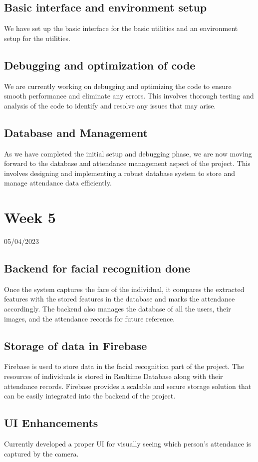 \documentclass[12pt]{book}
\begin{document}
	\section{Basic interface and environment setup}
	We have set up the basic interface for the basic utilities and an environment setup for the utilities.
	\section{Debugging and optimization of code}
	We are currently working on debugging and optimizing the code to ensure smooth performance and eliminate any errors. This involves thorough testing and analysis of the code to identify and resolve any issues that may arise.
	\section{Database and Management}
	As we have completed the initial setup and debugging phase, we are now moving forward to the database and attendance management aspect of the project. This involves designing and implementing a robust database system to store and manage attendance data efficiently.
	
	
	\chapter{Week 5}
	\justifying
	\large
	05/04/2023
	
	\paragraph{}
	\section{Backend for facial recognition done}
	Once the system captures the face of the individual, it compares the extracted features with the stored features in the database and marks the attendance accordingly. The backend also manages the database of all the users, their images, and the attendance records for future reference.
	\section{Storage of data in Firebase}
	Firebase is used to store data in the facial recognition part of the project. The resources of individuals is stored in Realtime Database along with their attendance records. Firebase provides a scalable and secure storage solution that can be easily integrated into the backend of the project.
	\section{UI Enhancements}
	Currently developed a proper UI for visually seeing which person's attendance is captured by the camera.
	
\end{document}
